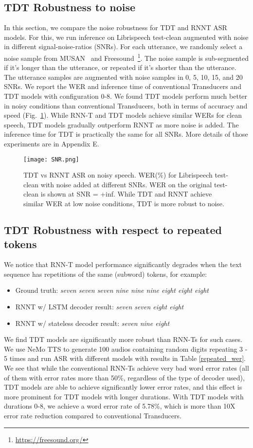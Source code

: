 \documentclass{article}
\begin{document}
\subsection{TDT Robustness to noise}
In this section, we compare the noise robustness for TDT and RNNT ASR models. For this, we run inference on Librispeech test-clean augmented with noise in different signal-noise-ratios (SNRs). 
For each utterance, we randomly select a noise sample from MUSAN~\cite{snyder2015musan} and Freesound~\footnote{\url{https://freesound.org/}}. 
The noise sample is sub-segmented if it's longer than the utterance, or repeated if it's shorter than the utterance. The utterance samples are augmented with noise samples in 0, 5, 10, 15, and 20 SNRs.
We report the WER and inference time of conventional Transducers and TDT models with configuration 0-8.
We found TDT models perform much better in noisy conditions than conventional Transducers, both in terms of accuracy and speed (Fig.~\ref{SNR}). While RNN-T and TDT models achieve similar WERs for clean speech, TDT models gradually outperform RNNT as more noise is added.  The inference time for TDT is practically the same for all SNRs. More details of those experiments are in Appendix E.
\begin{figure}[h!]
    \centering
    \texttt{[image: SNR.png]}
    \caption{TDT vs RNNT ASR on noisy speech. WER(\%) for Librispeech test-clean with noise added at different SNRs. WER on the original test-clean is shown at SNR = +inf. While TDT and RNNT achieve similar WER at low noise conditions, TDT is more robust to noise.}
    \label{SNR}
\end{figure}


\subsection{TDT Robustness with respect to repeated tokens}
We notice that RNN-T model performance significantly degrades when the text sequence has repetitions of the same (subword) tokens, for example:
\begin{itemize}
    \item Ground truth: \emph{seven seven seven nine nine nine eight eight eight}
    \item RNNT w/ LSTM decoder result: \emph{seven seven eight eight}
    \item RNNT w/ stateless decoder result: \emph{seven nine eight}
\end{itemize}
We find TDT models are significantly more robust than RNN-Ts for such cases. 
We use NeMo TTS to generate 100 audios containing random digits repeating 3 - 5 times and run ASR with different models with results in Table \ref{repeated_wer}. We see that while the conventional RNN-Ts achieve very bad word error rates (all of them with error rates more than 50\%, regardless of the type of decoder used), TDT models are able to achieve significantly lower error rates, and this effect is more prominent for TDT models with longer durations. With TDT models with durations 0-8, we achieve a word error rate of 5.78\%, which is more than 10X error rate reduction compared to conventional Transducers. 
\end{document}
